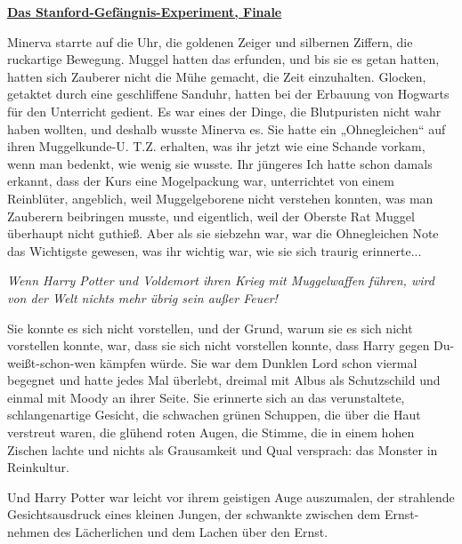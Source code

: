 

\hypertarget{das-stanford-gefuxe4ngnis-experiment-finale}{%

\textbf{\uline{Das Stanford-Gefängnis-Experiment, Finale}}

\hfill\break Minerva starrte auf die Uhr, die goldenen Zeiger und silbernen Ziffern, die ruckartige Bewegung. Muggel hatten das erfunden, und bis sie es getan hatten, hatten sich Zauberer nicht die Mühe gemacht, die Zeit einzuhalten. Glocken, getaktet durch eine geschliffene Sanduhr, hatten bei der Erbauung von Hogwarts für den Unterricht gedient. Es war eines der Dinge, die Blutpuristen nicht wahr haben wollten, und deshalb wusste Minerva es. Sie hatte ein „Ohnegleichen“ auf ihren Muggelkunde-U. T.Z. erhalten, was ihr jetzt wie eine Schande vorkam, wenn man bedenkt, wie wenig sie wusste. Ihr jüngeres Ich hatte schon damals erkannt, dass der Kurs eine Mogelpackung war, unterrichtet von einem Reinblüter, angeblich, weil Muggelgeborene nicht verstehen konnten, was man Zauberern beibringen musste, und eigentlich, weil der Oberste Rat Muggel überhaupt nicht guthieß. Aber als sie siebzehn war, war die Ohnegleichen Note das Wichtigste gewesen, was ihr wichtig war, wie sie sich traurig erinnerte...

\emph{Wenn Harry Potter und Voldemort ihren Krieg mit Muggelwaffen führen, wird von der Welt nichts mehr übrig sein außer Feuer!}

Sie konnte es sich nicht vorstellen, und der Grund, warum sie es sich nicht vorstellen konnte, war, dass sie sich nicht vorstellen konnte, dass Harry gegen Du-weißt-schon-wen kämpfen würde. Sie war dem Dunklen Lord schon viermal begegnet und hatte jedes Mal überlebt, dreimal mit Albus als Schutzschild und einmal mit Moody an ihrer Seite. Sie erinnerte sich an das verunstaltete, schlangenartige Gesicht, die schwachen grünen Schuppen, die über die Haut verstreut waren, die glühend roten Augen, die Stimme, die in einem hohen Zischen lachte und nichts als Grausamkeit und Qual versprach: das Monster in Reinkultur.

Und Harry Potter war leicht vor ihrem geistigen Auge auszumalen, der strahlende Gesichtsausdruck eines kleinen Jungen, der schwankte zwischen dem Ernst-nehmen des Lächerlichen und dem Lachen über den Ernst.

}
